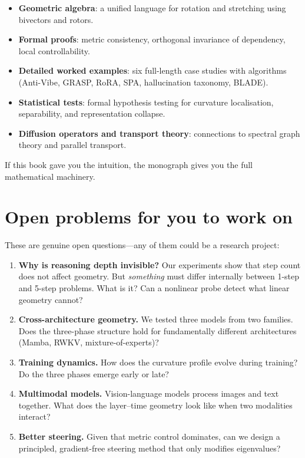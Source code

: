 \documentclass[11pt, twoside, openright]{memoir}
\begin{document}
\begin{itemize}[nosep]
\item \textbf{Geometric algebra}: a unified language for rotation and
  stretching using bivectors and rotors.
\item \textbf{Formal proofs}: metric consistency, orthogonal invariance
  of dependency, local controllability.
\item \textbf{Detailed worked examples}: six full-length case studies
  with algorithms (Anti-Vibe, GRASP, RoRA, SPA, hallucination taxonomy,
  BLADE).
\item \textbf{Statistical tests}: formal hypothesis testing for
  curvature localisation, separability, and representation collapse.
\item \textbf{Diffusion operators and transport theory}: connections to
  spectral graph theory and parallel transport.
\end{itemize}

If this book gave you the intuition, the monograph gives you the full
mathematical machinery.

\section{Open problems for you to work on}

These are genuine open questions---any of them could be a research project:

\begin{enumerate}
\item \textbf{Why is reasoning depth invisible?} Our experiments show
  that step count does not affect geometry. But \emph{something} must
  differ internally between 1-step and 5-step problems. What is it?
  Can a nonlinear probe detect what linear geometry cannot?

\item \textbf{Cross-architecture geometry.} We tested three models from
  two families. Does the three-phase structure hold for fundamentally
  different architectures (Mamba, RWKV, mixture-of-experts)?

\item \textbf{Training dynamics.} How does the curvature profile evolve
  during training? Do the three phases emerge early or late?

\item \textbf{Multimodal models.} Vision-language models process images
  and text together. What does the layer--time geometry look like when
  two modalities interact?

\item \textbf{Better steering.} Given that metric control dominates,
  can we design a principled, gradient-free steering method that only
  modifies eigenvalues?
\end{enumerate}
\end{document}
